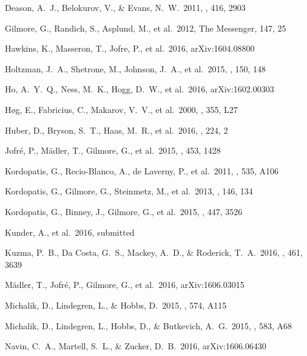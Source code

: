 \documentclass[preprint,trackchanges]{aastex}
\begin{document}
\begin{thebibliography}{dummy}
 Deason, A.~J., Belokurov, V., \& Evans, N.~W.\ 2011, \mnras, 416, 2903 

 Gilmore, G., Randich, S., Asplund, M., et al.\ 2012, The Messenger, 147, 25

 Hawkins, K., Masseron, T., Jofre, P., et al.\ 2016, arXiv:1604.08800 

 Holtzman, J.~A., Shetrone, M., Johnson, J.~A., et al.\ 2015, \aj, 150, 148 

 Ho, A.~Y.~Q., Ness, M.~K., Hogg, D.~W., et al.\ 2016, arXiv:1602.00303 
 
 H{\o}g, E., Fabricius, C., Makarov, V.~V., et al.\ 2000, \aap, 355, L27 

 Huber, D., Bryson, S.~T., Haas, M.~R., et al.\ 2016, \apjs, 224, 2 

 Jofr{\'e}, P., M{\"a}dler, T., Gilmore, G., et al.\ 2015, \mnras, 453, 1428 

 Kordopatis, G., Recio-Blanco, A., de Laverny, P., et al.\ 2011, \aap, 535, A106 

 Kordopatis, G., Gilmore, G., Steinmetz, M., et al.\ 2013, \aj, 146, 134 

 Kordopatis, G., Binney, J., Gilmore, G., et al.\ 2015, \mnras, 447, 3526 

 Kunder, A., et al.\ 2016, submitted

 Kuzma, P.~B., Da Costa, G.~S., Mackey, A.~D., \& Roderick, T.~A.\ 2016, \mnras, 461, 3639 

 M{\"a}dler, T., Jofr{\'e}, P., Gilmore, G., et al.\ 2016, arXiv:1606.03015 

 Michalik, D., Lindegren, L., \& Hobbs, D.\ 2015, \aap, 574, A115 

 Michalik, D., Lindegren, L., Hobbs, D., \& Butkevich, A.~G.\ 2015, \aap, 583, A68 

 Navin, C.~A., Martell, S.~L., \& Zucker, D.~B.\ 2016, arXiv:1606.06430 


\end{thebibliography}
\end{document}
